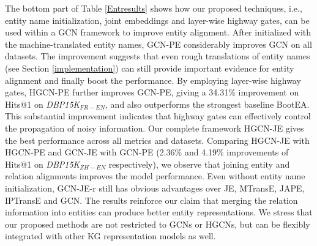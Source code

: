 \documentclass[11pt,a4paper]{article}
\begin{document}
The bottom part of Table \ref{Entresults} shows how our proposed techniques, i.e., entity name initialization, joint embeddings and
layer-wise highway gates, can be used within a GCN framework to improve entity alignment. After initialized with the machine-translated
entity names, GCN-PE considerably improves GCN on all datasets. The improvement suggests that even rough translations of entity names (see
Section \ref{implementation}) can still provide important evidence for entity alignment and finally boost the performance. By employing layer-wise highway
gates, HGCN-PE further improves GCN-PE, giving a 34.31\% improvement on Hits@1 on \textit{DBP15K}$_{FR-EN}$, and also outperforms the strongest baseline BootEA. This substantial improvement indicates that highway gates can effectively control the propagation of noisy information. Our complete
framework HGCN-JE gives the best performance across all metrics and datasets. Comparing HGCN-JE with HGCN-PE and GCN-JE with GCN-PE (2.36\%
and 4.19\% improvements of Hits@1 on \textit{DBP15K}$_{ZH-EN}$ respectively), we observe that joining entity and relation alignments
improves the model performance. Even without entity name initialization, GCN-JE-r still has obvious advantages over JE, MTransE, JAPE,
IPTransE and GCN. The results reinforce our claim that merging the relation information into entities can produce better entity
representations. We stress that our proposed methods are not restricted to GCNs or HGCNs, but can be flexibly integrated with other KG
representation models as well.
\end{document}
